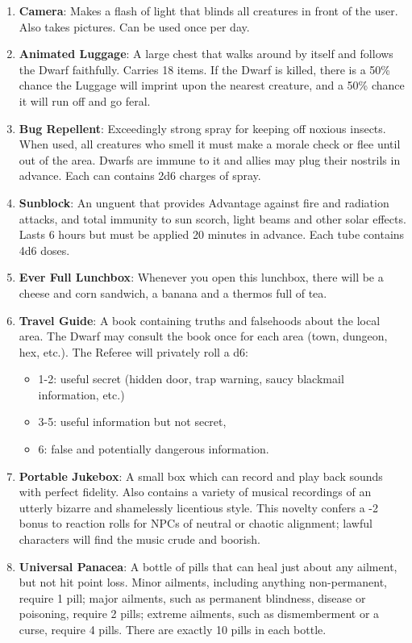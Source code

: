 \documentclass[twoside]{article}
\begin{document}
\begin{enumerate}[nosep]
\item \textbf{Camera}: Makes a flash of light that blinds all creatures in front of the user. Also takes pictures. Can be used once per day.
\item \textbf{Animated Luggage}: A large chest that walks around by itself and follows the Dwarf faithfully. Carries 18 items. If the Dwarf is killed, there is a 50\% chance the Luggage will imprint upon the nearest creature, and a 50\% chance it will run off and go feral.
\item \textbf{Bug Repellent}: Exceedingly strong spray for keeping off noxious insects. When used, all creatures who smell it must make a morale check or flee until out of the area. Dwarfs are immune to it and allies may plug their nostrils in advance. Each can contains 2d6 charges of spray.
\item \textbf{Sunblock}: An unguent that provides Advantage against fire and radiation attacks, and total immunity to sun scorch, light beams and other solar effects. Lasts 6 hours but must be applied 20 minutes in advance. Each tube contains 4d6 doses.
\item \textbf{Ever Full Lunchbox}: Whenever you open this lunchbox, there will be a cheese and corn sandwich, a banana and a thermos full of tea.
\item \textbf{Travel Guide}: A book containing truths and falsehoods about the local area. The Dwarf may consult the book once for each area (town, dungeon, hex, etc.). The Referee will privately roll a d6:
\begin{itemize}[nosep]
\item1-2: useful secret (hidden door, trap warning, saucy blackmail information, etc.)
\item 3-5: useful information but not secret,
\item 6: false and potentially dangerous information.
\end{itemize}
\item \textbf{Portable Jukebox}: A small box which can record and play back sounds with perfect fidelity. Also contains a variety of musical recordings of an utterly bizarre and shamelessly licentious style. This novelty confers a -2 bonus to reaction rolls for NPCs of neutral or chaotic alignment; lawful characters will find the music crude and boorish.
\item \textbf{Universal Panacea}: A bottle of pills that can heal just about any ailment, but not hit point loss. Minor ailments, including anything non-permanent, require 1 pill; major ailments, such as permanent blindness, disease or poisoning, require 2 pills; extreme ailments, such as dismemberment or a curse, require 4 pills. There are exactly 10 pills in each bottle.
\end{enumerate}
\end{document}
